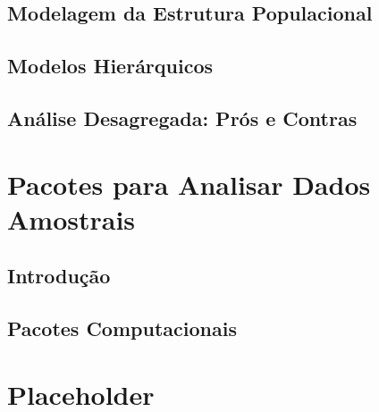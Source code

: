 \documentclass[]{book}
\theoremstyle{definition}
\theoremstyle{definition}
\theoremstyle{definition}
\theoremstyle{remark}
\begin{document}
\section{Modelagem da Estrutura
Populacional}\label{modelagem-da-estrutura-populacional}

\section{Modelos Hierárquicos}\label{modelos-hierarquicos-1}

\section{Análise Desagregada: Prós e
Contras}\label{analise-desagregada-pros-e-contras}

\chapter{Pacotes para Analisar Dados Amostrais}\label{pacotes}

\section{Introdução}\label{introducao-8}

\section{Pacotes Computacionais}\label{pacotes-computacionais}

\chapter{Placeholder}\label{placeholder}


\end{document}
